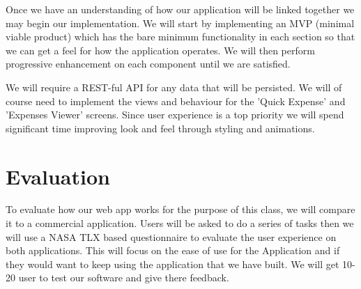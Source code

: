 \documentclass{chi2011}
\begin{document}
Once we have an understanding of how our application will be linked together we
may begin our implementation. We will start by implementing an MVP (minimal
viable product) which has the bare minimum functionality in each section so that
we can get a feel for how the application operates. We will then perform
progressive enhancement on each component until we are satisfied.

We will require a REST-ful API for any data that will be persisted. We will of
course need to implement the views and behaviour for the 'Quick Expense' and
'Expenses Viewer' screens. Since user experience is a top priority we will spend
significant time improving look and feel through styling and animations.

\section{Evaluation}
To evaluate how our web app works for the purpose of this class, we will compare
it to a commercial application. Users will be asked to do a series of tasks then
we will use a NASA TLX based questionnaire to evaluate the user experience on
both applications. This will focus on the ease of use for the Application and
if they would want to keep using the application that we have built. We will get
10-20 user to test our software and give there feedback.  
% 
% 
\end{document}
